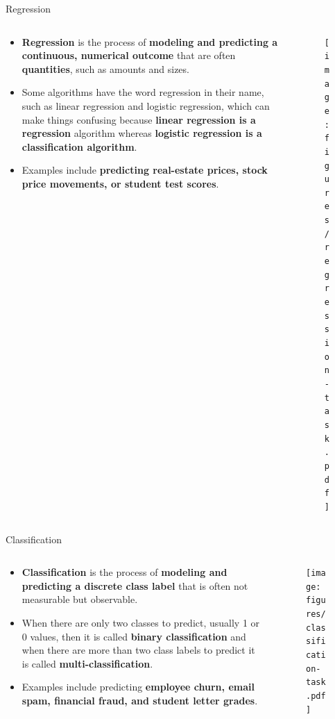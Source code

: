 \documentclass[main.tex]{subfiles}
\begin{document}
    \begin{frame}{Regression}
        \begin{columns}
            \begin{column}{.6\textwidth}
                \begin{itemize}
                    \item \textbf{Regression} is the process of \textbf{modeling and predicting a continuous, numerical outcome} that are often \textbf{quantities}, such as amounts and sizes.
                    \item Some algorithms have the word regression in their name, such as linear regression and logistic regression, which can make things confusing because \textbf{linear regression is a regression} algorithm whereas \textbf{logistic regression is a classification algorithm}. 
                    \item Examples include \textbf{predicting real-estate prices, stock price movements, or student test scores}.
                \end{itemize}
            \end{column}
            \begin{column}{.4\textwidth}
                \begin{figure}
                    \label{fig:regression-task}
                    \texttt{[image: figures/regression-task.pdf]}
                \end{figure}
            \end{column}
        \end{columns}
    \end{frame}

    \begin{frame}{Classification}
        \begin{columns}
            \begin{column}{.6\textwidth}
                \begin{itemize}
                    \item \textbf{Classification} is the process of \textbf{modeling and predicting a discrete class label} that is often not measurable but observable.
                    \item When there are only two classes to predict, usually 1 or 0 values, then it is called \textbf{binary classification} and when there are more than two class labels to predict it is called \textbf{multi-classification}.
                    \item Examples include predicting \textbf{employee churn, email spam, financial fraud, and student letter grades}.
                \end{itemize}
            \end{column}
            \begin{column}{.4\textwidth}
                \begin{figure}
                    \label{fig:classification-task}
                    \texttt{[image: figures/classification-task.pdf]}
                \end{figure}
            \end{column}
        \end{columns}
    \end{frame}
\end{document}
